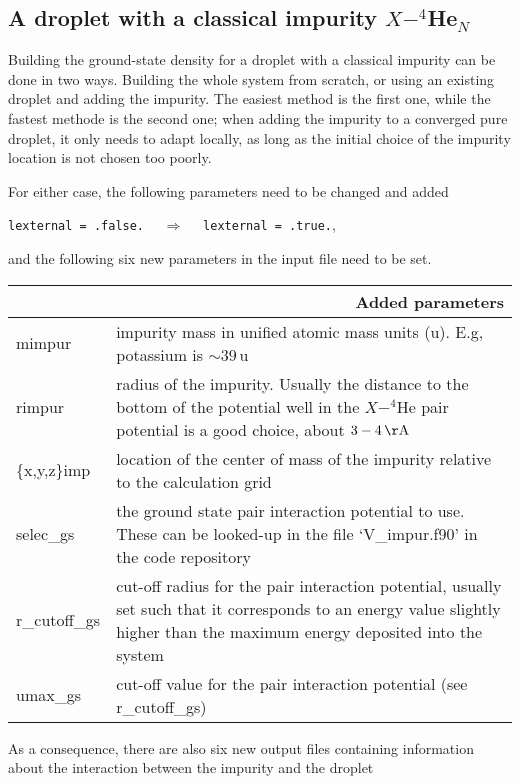 \documentclass[10pt,a4paper]{article}
\begin{document}
	\subsection{A droplet with a classical impurity $X-^4$He$_{N}$}
	
	Building the ground-state density for a droplet with a classical impurity can be done in two ways. Building the whole system from scratch, or using an existing droplet and adding the impurity. The easiest method is the first one, while the fastest methode is the second one; when adding the impurity to a converged pure droplet, it only needs to adapt locally, as long as the initial choice of the impurity location is not chosen too poorly.
	
	For either case, the following parameters need to be changed and added
	\begin{center}
		\verb|lexternal = .false.|	$\quad\Longrightarrow\quad$	\verb|lexternal = .true.|,
	\end{center}
	and the following six new parameters in the input file need to be set.
	
	\begin{center}
		\begin{tabular}{l|p{9.75cm}}
			\multicolumn{2}{r}{\textbf{Added parameters}} \\
			\hline\hline
			mimpur 			& impurity mass in unified atomic mass units (u). E.g, potassium is $\sim\!39\,\mathrm{u}$ 	\\
			rimpur			& radius of the impurity. Usually the distance to the bottom of the potential well in the $X-^4$He pair potential is a good choice, about $3-4\,\mathrm{\AA}$	\\
			\{x,y,z\}imp	& location of the center of mass of the impurity relative to the calculation grid	\\
			selec\_gs		& the ground state pair interaction potential to use. These can be looked-up in the file `V\_impur.f90' in the code repository\\
			r\_cutoff\_gs	& cut-off radius for the pair interaction potential, usually set such that it corresponds to an energy value slightly higher than the maximum energy deposited into the system 	\\
			umax\_gs 		& cut-off value for the pair interaction potential (see r\_cutoff\_gs)
		\end{tabular}
	\end{center}
	\vspace{0.2cm}
	As a consequence, there are also six new output files containing information about the interaction between the impurity and the droplet
	
\end{document}
